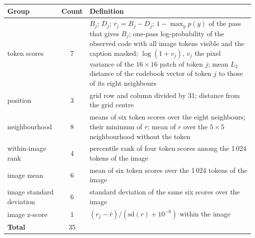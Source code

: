 \begin{tabular}{@{}lcp{}@{}}
\toprule
Group & Count & Definition \\
\midrule
token scores & 7 & $B_j$; $D_j$; $r_j=B_j-D_j$; $1-\max_y p(y)$ of the pass that gives $B_j$; one-pass log-probability of the observed code with all
image tokens visible and the caption masked; $\log(1+v_j)$, $v_j$ the pixel variance of the $16\times16$ patch of token $j$; mean
$L_2$ distance of the codebook vector of token $j$ to those of its eight neighbours \\
position & 3 & grid row and column divided by 31; distance from the grid centre \\
neighbourhood & 8 & means of six token scores over the eight neighbours; their minimum of $r$; mean of $r$ over the $5\times5$
neighbourhood without the token \\
within-image rank & 4 & percentile rank of four token scores among the 1\,024 tokens of the image \\
image mean & 6 & mean of six token scores over the 1\,024 tokens of the image \\
image standard deviation & 6 & standard deviation of the same six scores over the image \\
image z-score & 1 & $(r_j-\bar r)/(\mathrm{sd}(r)+10^{-6})$ within the image \\
\textbf{Total} & 35 & \\
\bottomrule
\end{tabular}
